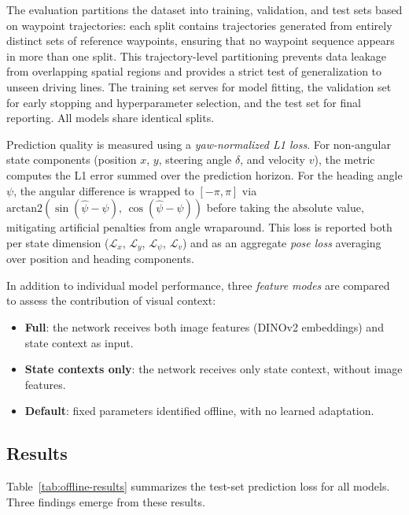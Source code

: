 The evaluation partitions the dataset into training, validation, and test sets based on waypoint trajectories: each split contains trajectories generated from entirely distinct sets of reference waypoints, ensuring that no waypoint sequence appears in more than one split. This trajectory-level partitioning prevents data leakage from overlapping spatial regions and provides a strict test of generalization to unseen driving lines. The training set serves for model fitting, the validation set for early stopping and hyperparameter selection, and the test set for final reporting. All models share identical splits.

Prediction quality is measured using a \emph{yaw-normalized L1 loss}. For non-angular state components (position $x$, $y$, steering angle $\delta$, and velocity $v$), the metric computes the L1 error summed over the prediction horizon. For the heading angle $\psi$, the angular difference is wrapped to $[-\pi, \pi]$ via $\text{arctan2}(\sin(\hat{\psi} - \psi),\, \cos(\hat{\psi} - \psi))$ before taking the absolute value, mitigating artificial penalties from angle wraparound. This loss is reported both per state dimension ($\mathcal{L}_x$, $\mathcal{L}_y$, $\mathcal{L}_\psi$, $\mathcal{L}_v$) and as an aggregate \emph{pose loss} averaging over position and heading components.

In addition to individual model performance, three \emph{feature modes} are compared to assess the contribution of visual context:
\begin{itemize}
    \item \textbf{Full}: the network receives both image features (DINOv2 embeddings) and state context as input.
    \item \textbf{State contexts only}: the network receives only state context, without image features.
    \item \textbf{Default}: fixed parameters identified offline, with no learned adaptation.
\end{itemize}

\subsection{Results}

Table~\ref{tab:offline-results} summarizes the test-set prediction loss for all models. Three findings emerge from these results.

